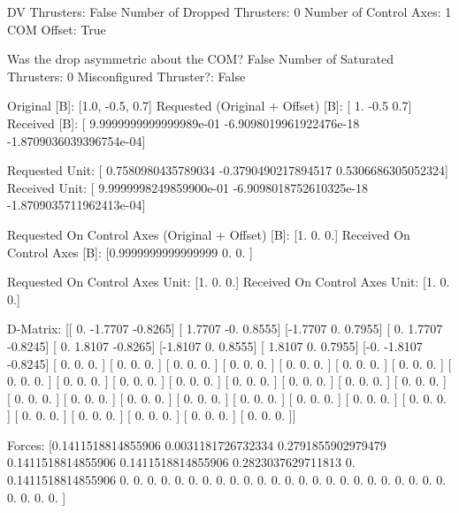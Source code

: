 DV Thrusters:	False
Number of Dropped Thrusters:	0
Number of Control Axes:	1
COM Offset:	True

Was the drop asymmetric about the COM?	False
Number of Saturated Thrusters:	0
Misconfigured Thruster?:	False

Original [B]:	[1.0, -0.5, 0.7]
Requested (Original + Offset) [B]:	[ 1.  -0.5  0.7]
Received [B]:		[ 9.9999999999999989e-01 -6.9098019961922476e-18 -1.8709036039396754e-04]

Requested Unit:		[ 0.7580980435789034 -0.3790490217894517  0.5306686305052324]
Received Unit:		[ 9.9999998249859900e-01 -6.9098018752610325e-18 -1.8709035711962413e-04]

Requested On Control Axes (Original + Offset) [B]:	[1. 0. 0.]
Received On Control Axes [B]:		[0.9999999999999999 0.                 0.                ]

Requested On Control Axes Unit:		[1. 0. 0.]
Received On Control Axes Unit:		[1. 0. 0.]

D-Matrix:
[[ 0.     -1.7707 -0.8265]
 [ 1.7707 -0.      0.8555]
 [-1.7707  0.      0.7955]
 [ 0.      1.7707 -0.8245]
 [ 0.      1.8107 -0.8265]
 [-1.8107  0.      0.8555]
 [ 1.8107  0.      0.7955]
 [-0.     -1.8107 -0.8245]
 [ 0.      0.      0.    ]
 [ 0.      0.      0.    ]
 [ 0.      0.      0.    ]
 [ 0.      0.      0.    ]
 [ 0.      0.      0.    ]
 [ 0.      0.      0.    ]
 [ 0.      0.      0.    ]
 [ 0.      0.      0.    ]
 [ 0.      0.      0.    ]
 [ 0.      0.      0.    ]
 [ 0.      0.      0.    ]
 [ 0.      0.      0.    ]
 [ 0.      0.      0.    ]
 [ 0.      0.      0.    ]
 [ 0.      0.      0.    ]
 [ 0.      0.      0.    ]
 [ 0.      0.      0.    ]
 [ 0.      0.      0.    ]
 [ 0.      0.      0.    ]
 [ 0.      0.      0.    ]
 [ 0.      0.      0.    ]
 [ 0.      0.      0.    ]
 [ 0.      0.      0.    ]
 [ 0.      0.      0.    ]
 [ 0.      0.      0.    ]
 [ 0.      0.      0.    ]
 [ 0.      0.      0.    ]
 [ 0.      0.      0.    ]]

Forces:
[0.1411518814855906 0.0031181726732334 0.2791855902979479
 0.1411518814855906 0.1411518814855906 0.2823037629711813
 0.                 0.1411518814855906 0.
 0.                 0.                 0.
 0.                 0.                 0.
 0.                 0.                 0.
 0.                 0.                 0.
 0.                 0.                 0.
 0.                 0.                 0.
 0.                 0.                 0.
 0.                 0.                 0.
 0.                 0.                 0.                ]


